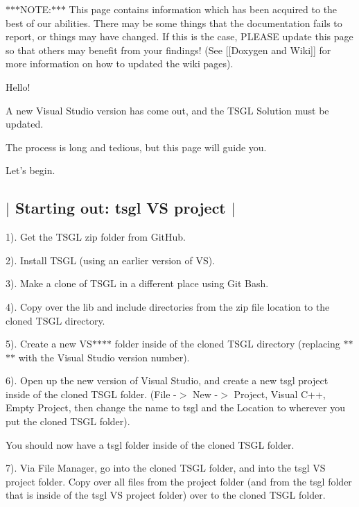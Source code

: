 $\ast$$\ast$$\ast$\-N\-O\-T\-E\-:$\ast$$\ast$$\ast$ This page contains information which has been acquired to the best of our abilities. There may be some things that the documentation fails to report, or things may have changed. If this is the case, P\-L\-E\-A\-S\-E update this page so that others may benefit from your findings! (See \mbox{[}\mbox{[}Doxygen and Wiki\mbox{]}\mbox{]} for more information on how to updated the wiki pages).

Hello!

A new Visual Studio version has come out, and the T\-S\-G\-L Solution must be updated.

The process is long and tedious, but this page will guide you.

Let's begin. 

 \subsection*{$\vert$ Starting out\-: tsgl V\-S project $\vert$ }

1). Get the T\-S\-G\-L zip folder from Git\-Hub.

2). Install T\-S\-G\-L (using an earlier version of V\-S).

3). Make a clone of T\-S\-G\-L in a different place using Git Bash.

4). Copy over the {\ttfamily lib} and {\ttfamily include} directories from the zip file location to the cloned T\-S\-G\-L directory.

5). Create a new {\ttfamily V\-S$\ast$$\ast$$\ast$$\ast$} folder inside of the cloned T\-S\-G\-L directory (replacing {\ttfamily $\ast$$\ast$$\ast$$\ast$} with the Visual Studio version number).

6). Open up the new version of Visual Studio, and create a new {\ttfamily tsgl} project inside of the cloned T\-S\-G\-L folder. ({\ttfamily File -\/$>$ New -\/$>$ Project}, {\ttfamily Visual C++}, {\ttfamily Empty Project}, then change the name to {\ttfamily tsgl} and the {\ttfamily Location} to wherever you put the cloned T\-S\-G\-L folder).

You should now have a {\ttfamily tsgl} folder inside of the cloned T\-S\-G\-L folder.

7). Via File Manager, go into the cloned T\-S\-G\-L folder, and into the {\ttfamily tsgl} V\-S project folder. Copy over all files from the project folder (and from the {\ttfamily tsgl} folder that is inside of the {\ttfamily tsgl} V\-S project folder) over to the cloned T\-S\-G\-L folder.

